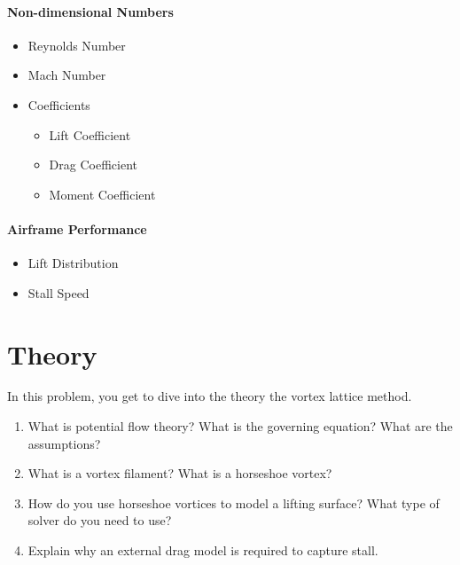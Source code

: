 \documentclass[11pt]{article}
\begin{document}
\paragraph{Non-dimensional Numbers}
\begin{itemize}
	\item Reynolds Number
	\item Mach Number
	\item Coefficients
	\begin{itemize}
		\item Lift Coefficient
		\item Drag Coefficient
		\item Moment Coefficient
	\end{itemize}
\end{itemize}

\paragraph{Airframe Performance}
\begin{itemize}
	\item Lift Distribution
	\item Stall Speed
\end{itemize}

\section{Theory}
\label{sec:theory}
In this problem, you get to dive into the theory the vortex lattice method. 

\begin{enumerate}[label=\roman*.]
	\item What is potential flow theory? What is the governing equation? What are the assumptions? 
	\item What is a vortex filament? What is a horseshoe vortex? 
	\item How do you use horseshoe vortices to model a lifting surface? What type of solver do you need to use? 
	\item Explain why an external drag model is required to capture stall.
\end{enumerate}
\end{document}
